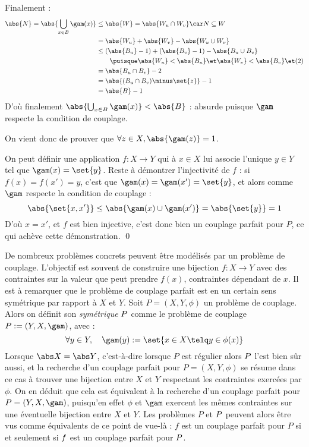     Finalement :
    \[ \begin{aligned}
        \abs{N} = \abs{\bigcup_{x \in B} \gam (x)} &\leq \abs{W} = \abs{ W_u \cap W_v } \car N \subseteq W \\
        & =    \abs {W_u} + \abs{W_v} - \abs{W_u \cup W_v}\\
        & \leq (\abs {B_u} - 1)  + (\abs{B_v} - 1) - \abs{B_u \cup B_v} \\
        &    \qquad  \puisque \abs{W_u} < \abs{B_u} \et \abs{W_v} < \abs{B_v} \et \text{(2)} \\
        & =    \abs {B_u \cap B_v} - 2 \\
        & =    \abs {(B_u \cap B_v) \minus \set{z}} - 1 \\
        & =    \abs{B} - 1
    \end{aligned} \]
    D'où finalement $\abs{\bigcup_{x \in B} \gam (x)} < \abs{B}$ : absurde puisque $\gam$ respecte la condition de couplage.
    
    On vient donc de prouver que $\forall z \in X, \abs{\gam(z)} = 1$.
    
    On peut définir une application $f : X \to Y$ qui à $x \in X$ lui associe l'unique $y \in Y$ tel que $\gam(x) = \set{y}$. Reste à démontrer l'injectivité de $f$ : si $f(x) = f(x') = y$, c'est que $\gam(x) = \gam(x') = \set{y}$, et alors comme $\gam$ respecte la condition de couplage :
    \[ \abs{\set{x,x'}} \leq \abs{\gam(x) \cup \gam(x')} = \abs{\set{y}} = 1 \]
    D'où $x = x'$, et $f$ est bien injective, c'est donc bien un couplage parfait pour $P$, ce qui achève cette démonstration.
 \qed\SEP
 
 De nombreux problèmes concrets peuvent être modélisés par un problème de couplage. L'objectif est souvent de construire une bijection $f : X \to Y$ avec des contraintes sur la valeur que peut prendre $f(x)$, contraintes dépendant de $x$. Il est à remarquer que le problème de couplage parfait est en un certain sens symétrique par rapport à $X$ et $Y$.
 \SEP\jdefi
    Soit $P = (X,Y,\phi)$ un problème de couplage. Alors on définit son \emph{symétrique} $P\-$ comme le problème de couplage $P\- := (Y,X,\gam)$, avec :
    \[ \forall y \in Y, \quad \gam(y) := \set{ x \in X \telq y \in \phi(x) } \]
 \SEP
 Lorsque $\abs X = \abs Y$, c'est-à-dire lorsque $P$ est régulier alors $P\-$ l'est bien sûr aussi, et la recherche d'un couplage parfait pour $P = (X,Y,\phi)$ se résume dans ce cas à trouver une bijection entre $X$ et $Y$ respectant les contraintes exercées par $\phi$. On en déduit que cela est équivalent à la recherche d'un couplage parfait pour $P\- = (Y,X,\gam)$, puisqu'en effet $\phi$ et $\gam$ exercent les mêmes contraintes sur une éventuelle bijection entre $X$ et $Y$. Les problèmes $P$ et $P\-$ peuvent alors être vus comme équivalents de ce point de vue-là : $f$ est un couplage parfait pour $P$ si et seulement si $f\-$ est un couplage parfait pour $P\-$.
 
